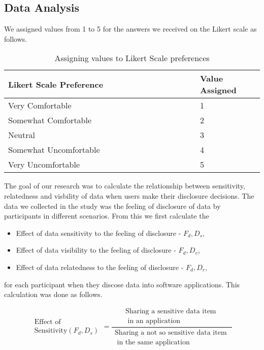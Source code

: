 \documentclass[conference]{IEEEtran}
\begin{document}
\subsection {Data Analysis}

We assigned values from 1 to 5 for the answers we received on the Likert scale as follows.

\begin{center}
\begin{table}[htbp]
\caption{Assigning values to Likert Scale preferences}
\begin{center}
\begin{adjustbox}{width=0.5\textwidth}
\begin{tabular}{|p{0.75\linewidth}|p{0.25\linewidth}|}
\hline
Likert Scale Preference & Value Assigned \\
\hline
Very Comfortable & 1\\
\hline
Somewhat Comfortable& 2 \\
\hline
Neutral & 3  \\
\hline
Somewhat Uncomfortable & 4 \\
\hline
Very Uncomfortable & 5 \\
\hline
\end{tabular}
\end{adjustbox}
\end{center}
\end{table}
\end{center}

The goal of our research was to calculate the relationship between sensitivity, relatedness and visbility of data when users make their disclosure decisions. The data we collected in the study was the feeling of disclosure of data by participants in different scenarios. From this we first calculate the
\begin{itemize}
\item Effect of data sensitivity to the feeling of disclosure -  $F_d,D_s$, 
\item Effect of data visibility to the feeling of disclosure -  $F_d,D_v$, 
\item Effect of data relatedness to the feeling of disclosure -  $F_d,D_r$, 
\end{itemize}
for each participant when they discose data into software applications. This calculation was done as follows.

\[ \begin{aligned} \text{Effect of } \\ \text{Sensitivity}(F_{d}, D_{s}) \end{aligned} =
\frac{\begin{aligned}
      \text{Sharing a sensitive data item } \\ \text{ in an application}
      \end{aligned}}%
 {\begin{aligned}
      \text{Sharing a not so sensitive data item }\\ \text{ in the same application}
      \end{aligned}}
\]
\end{document}
